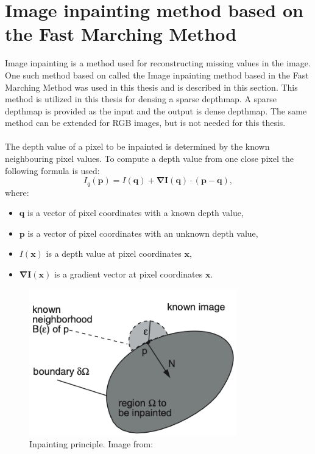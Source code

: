 \documentclass[twoside]{ctuthesis}
\theoremstyle{plain}
\theoremstyle{definition}
\theoremstyle{note}
\begin{document}
\section{Image inpainting method based on the Fast Marching Method} \label{inpainting}
Image inpainting is a method used for reconstructing missing values in the image. One such method based on \cite{cite:5} called the Image inpainting method based in the Fast Marching Method was used in this thesis and is described in this section. This method is utilized in this thesis for densing a sparse depthmap. A sparse depthmap is provided as the input and the output is dense depthmap. The same method can be extended for RGB images, but is not needed for this thesis.\\
\\
The depth value of a pixel to be inpainted is determined by the known neighbouring pixel values. To compute a depth value from one close pixel the following formula is used:
\begin{equation} \label{eq:1}
	I_q(\mathbf{p})=I(\mathbf{q})+\mathbf{\nabla I(q)}\cdot(\mathbf{p}-\mathbf{q}),
\end{equation}
where:
\begin{itemize}
	\item $\mathbf{q}$ is a vector of pixel coordinates with a known depth value,
	\item $\mathbf{p}$ is a vector of pixel coordinates with an unknown depth value,
	\item $I(\mathbf{x})$ is a depth value at pixel coordinates $\mathbf{x}$,
	\item $\mathbf{\nabla I(x)}$ is a gradient vector at pixel coordinates $\mathbf{x}$.
\end{itemize}
\begin{figure}
	\centering
	\includegraphics[width=9cm]{inpaint_principle.png}
	\caption[Inpainting principle.]{Inpainting principle. Image from: \cite{cite:5}}
	\label{fig:inpaint_schema}
\end{figure}
\end{document}
